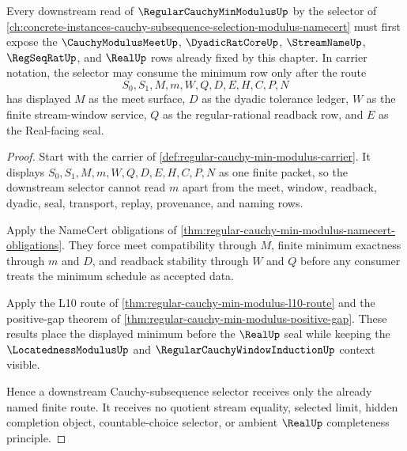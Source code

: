 \begin{theorem}
\label{thm:regular-cauchy-min-modulus-forward-sibling-route}
Every downstream read of $\RegularCauchyMinModulusUp$ by the selector of \autoref{ch:concrete-instances-cauchy-subsequence-selection-modulus-namecert} must first expose the $\CauchyModulusMeetUp$, $\DyadicRatCoreUp$, $\StreamNameUp$, $\RegSeqRatUp$, and $\RealUp$ rows already fixed by this chapter. In carrier notation, the selector may consume the minimum row only after the route
$$
S_0,S_1,M,m,W,Q,D,E,H,C,P,N
$$
has displayed $M$ as the meet surface, $D$ as the dyadic tolerance ledger, $W$ as the finite stream-window service, $Q$ as the regular-rational readback row, and $E$ as the Real-facing seal.
\end{theorem}
\begin{proof}
Start with the carrier of \autoref{def:regular-cauchy-min-modulus-carrier}. It displays $S_0,S_1,M,m,W,Q,D,E,H,C,P,N$ as one finite packet, so the downstream selector cannot read $m$ apart from the meet, window, readback, dyadic, seal, transport, replay, provenance, and naming rows.

Apply the NameCert obligations of \autoref{thm:regular-cauchy-min-modulus-namecert-obligations}. They force meet compatibility through $M$, finite minimum exactness through $m$ and $D$, and readback stability through $W$ and $Q$ before any consumer treats the minimum schedule as accepted data.

Apply the L10 route of \autoref{thm:regular-cauchy-min-modulus-l10-route} and the positive-gap theorem of \autoref{thm:regular-cauchy-min-modulus-positive-gap}. These results place the displayed minimum before the $\RealUp$ seal while keeping the $\LocatednessModulusUp$ and $\RegularCauchyWindowInductionUp$ context visible.

Hence a downstream Cauchy-subsequence selector receives only the already named finite route. It receives no quotient stream equality, selected limit, hidden completion object, countable-choice selector, or ambient $\RealUp$ completeness principle.
\end{proof}
